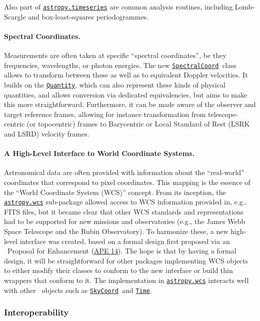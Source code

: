 \documentclass[modern]{aastex631}
\newcommand{\astropysubpkg}[1]{\href{http://docs.astropy.org/en/stable/#1/index.html}{\texttt{astropy.#1}}\xspace}
\newcommand{\astropyapi}[2]{\href{https://docs.astropy.org/en/stable/api/astropy.#1.html}{#2}}
\newcommand{\astropyapidoc}[2]{\astropyapi{#1}{\texttt{#2}\xspace}}
\newcommand{\astropySpectralCoord}{\astropyapidoc{coordinates.SpectralCoord}{SpectralCoord}}
\newcommand{\astropySkyCoord}{\astropyapidoc{coordinates.SkyCoord}{SkyCoord}}
\newcommand{\astropyTime}{\astropyapidoc{time.Time}{Time}}
\newcommand{\astropyQuantity}{\astropyapidoc{units.Quantity}{Quantity}}
\newcommand{\astropyAPE}[1]{\href{https://github.com/astropy/astropy-APEs/blob/main/APE#1.rst}{APE #1}\xspace}
\begin{document}
Also part of \astropysubpkg{timeseries} are common analysis routines,
including Lomb-Scargle and box-least-squares periodogrammes.

\paragraph{Spectral Coordinates.} Measurements are often taken at
specific ``spectral coordinates'', be they frequencies, wavelengths,
or photon energies.  The new \astropySpectralCoord\ class allows to
transform between these as well as to equivalent Doppler velocities.
It builds on the \astropyQuantity, which can also represent these
kinds of physical quantities, and allows conversion via dedicated
equivalencies, but aims to make this more straightforward.
Furthermore, it can be made aware of the observer and target reference
frames, allowing for instance transformation from telescope-centric (or
topocentric) frames to Barycentric or Local Standard of Rest
(LSRK and LSRD) velocity frames.

\paragraph{A High-Level Interface to World Coordinate Systems.}
Astronomical data are often provided with information about the
``real-world'' coordinates that correspond to pixel coordinates. This
mapping is the essence of the ``World Coordinate System (WCS)''
concept.  From its inception, the \astropysubpkg{wcs} sub-package
allowed access to WCS information provided in, e.g., FITS files, but
it became clear that other WCS standards and representations had to be
supported for new missions and observatories (e.g., the James Webb
Space Telescope and the Rubin Observatory).  To harmonize these, a new
high-level interface was created, based on a formal design first
proposed via an \astropy\ Proposal for Enhancement (\astropyAPE{14}).
The hope is that by having a formal design, it will be straightforward
for other packages implementing WCS objects to either modify their
classes to conform to the new interface or build thin wrappers that
conform to it.  The implementation in \astropysubpkg{wcs} interacts
well with other \astropypkg\ objects such as \astropySkyCoord\ and
\astropyTime.


\subsubsection*{Interoperability} \label{sec:core-features-interoperability}
\end{document}
